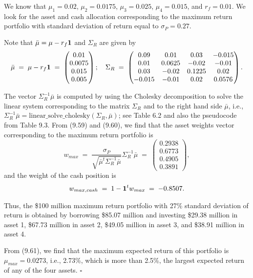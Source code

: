 \begin{answerx}
We know that $\mu_1=0.02$, $\mu_2=0.0175$, $\mu_3=0.025$, $\mu_4=0.015$, and $r_f=
0.01$. We look for the asset and cash allocation corresponding to the maximum return
portfolio with standard deviation of return equal to $\sigma_P = 0.27$.

Note that $\bar\mu=\mu-r_f\mathbf{1}$ and $\Sigma_R$ are given by
\[
\bar\mu \;=\; \mu-r_f\mathbf{1} \;=\; \begin{pmatrix} 0.01 \\ 0.0075 \\ 0.015 \\ 0.005 \end{pmatrix}; \quad
\Sigma_R \;=\; \begin{pmatrix}
0.09 & 0.01 & 0.03 & -0.015 \\
0.01 & 0.0625 & -0.02 & -0.01 \\
0.03 & -0.02 & 0.1225 & 0.02 \\
-0.015 & -0.01 & 0.02 & 0.0576
\end{pmatrix}.
\]

The vector $\Sigma_R^{-1}\bar\mu$ is computed by using the Cholesky decomposition to
solve the linear system corresponding to the matrix $\Sigma_R$ and to the right hand
side $\bar\mu$, i.e., $\Sigma_R^{-1}\bar\mu =
\text{linear\_solve\_cholesky}(\Sigma_R,\bar\mu)$; see Table 6.2 and also the
pseudocode from Table 9.3. From (9.59) and (9.60), we find that the asset weights
vector corresponding to the maximum return portfolio is
\[
w_{max} \;=\;
\frac{\sigma_P}{\sqrt{\bar\mu^t\Sigma_R^{-1}\bar\mu}}\Sigma_R^{-1}\bar\mu \;=\;
\begin{pmatrix} 0.2938 \\ 0.6773 \\ 0.4905 \\ 0.3891 \end{pmatrix},
\]
and the weight of the cash position is
\[
w_{max,cash} \;=\; 1-\mathbf{1}^tw_{max} \;=\; -0.8507.
\]

Thus, the \$100 million maximum return portfolio with 27\% standard deviation of
return is obtained by borrowing \$85.07 million and investing \$29.38 million in
asset 1, \$67.73 million in asset 2, \$49.05 million in asset 3, and \$38.91 million
in asset 4.

From (9.61), we find that the maximum expected return of this portfolio is
$\mu_{max} = 0.0273$, i.e., 2.73\%, which is more than 2.5\%, the largest expected
return of any of the four assets. \hfill$\square$
\end{answerx}
